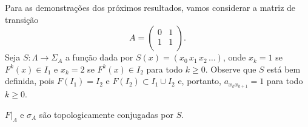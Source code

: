 Para as demonstrações dos próximos resultados, vamos considerar a matriz de transição
$$A =
\begin{pmatrix}
0 & 1 \\
1 & 1 \\
\end{pmatrix}.$$
Seja $S: \Lambda \to \Sigma_A$ a função dada por $S(x) = (x_0 \, x_1 \, x_2 \, \dots)$, onde $x_k = 1$ se $F^k(x) \in I_1$ e $x_k = 2$ se $F^k(x) \in I_2$ para todo $k \geq 0$. Observe que $S$ está bem definida, pois $F(I_1) = I_2$ e $F(I_2) \subset I_1 \cup I_2$ e, portanto, $a_{x_k x_{k+1}} = 1$ para todo $k \geq 0$. 

\begin{proposition}
$F|_\Lambda$ e $\sigma_A$ são topologicamente conjugadas por $S$.
\end{proposition}

